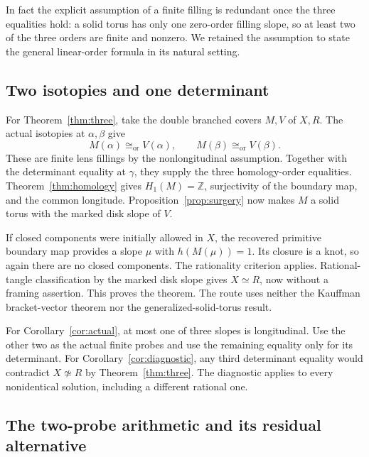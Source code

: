 \documentclass[11pt]{amsart}
\theoremstyle{definition}
\theoremstyle{remark}
\newcommand{\Z}{\mathbb Z}
\newcommand{\iso}{\cong_{\mathrm{or}}}
\begin{document}
In fact the explicit assumption of
a finite filling is redundant once
the three equalities hold: a solid
torus has only one zero-order filling
slope, so at least two of the three
orders are finite and nonzero.
We retained the assumption to state
the general linear-order formula
in its natural setting.

\subsection{Two isotopies and one determinant}

For Theorem~\ref{thm:three}, take the
double branched covers \(M,V\) of
\(X,R\). The actual isotopies at
\(\alpha,\beta\) give
\[
 M(\alpha)\iso V(\alpha),\qquad
 M(\beta)\iso V(\beta).
\]
These are finite lens fillings by
the nonlongitudinal assumption.
Together with the determinant
equality at \(\gamma\), they supply
the three homology-order equalities.
Theorem~\ref{thm:homology} gives
\(H_1(M)=\Z\), surjectivity of the
boundary map, and the common
longitude. Proposition~\ref{prop:surgery}
now makes \(M\) a solid torus with
the marked disk slope of \(V\).

If closed components were initially
allowed in \(X\), the recovered
primitive boundary map provides a
slope \(\mu\) with \(h(M(\mu))=1\).
Its closure is a knot, so again
there are no closed components.
The rationality criterion applies.
Rational-tangle classification by
the marked disk slope gives
\(X\simeq R\), now without a framing
assertion. This proves the theorem.
The route uses neither the
Kauffman bracket-vector theorem nor
the generalized-solid-torus result.

For Corollary~\ref{cor:actual}, at
most one of three slopes is
longitudinal. Use the other two as
the actual finite probes and use
the remaining equality only for
its determinant. For
Corollary~\ref{cor:diagnostic}, any
third determinant equality would
contradict \(X\not\simeq R\) by
Theorem~\ref{thm:three}. The
diagnostic applies to every
nonidentical solution, including a
different rational one.

\subsection{The two-probe arithmetic and its residual alternative}
\end{document}
